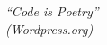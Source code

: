 \begin{epigrafe}
    \vspace*{\fill}
	\begin{flushright}
		\textit{``Code is Poetry''\\
		(Wordpress.org)}
	\end{flushright}
\end{epigrafe}